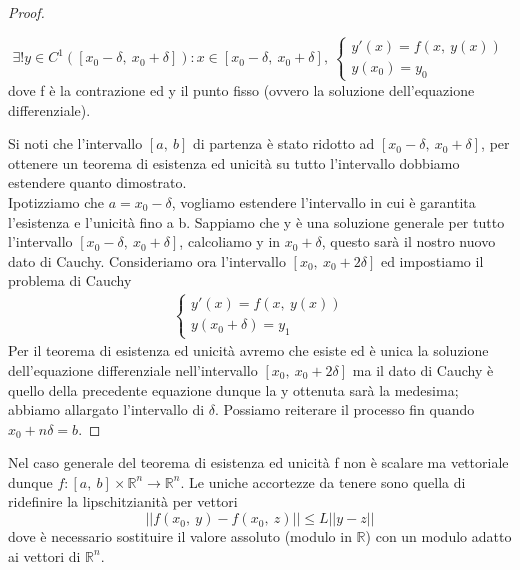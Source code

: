\documentclass[10pt,a4paper]{article}
\newtheorem{proof}{Proof}
\begin{document}
\begin{proof}
\begin{enumerate}
		\[\exists! y \in C^1([x_0-\delta,\ x_0 + \delta]): x\in [x_0-\delta,\ x_0+\delta],\
		 \begin{cases}
			y'(x)=f(x,\ y(x))\\
			y(x_0)=y_0
		\end{cases}\]
		dove f è la contrazione ed y il punto fisso (ovvero la soluzione dell'equazione differenziale). 
	\end{enumerate}
	Si noti che l'intervallo \([a,\ b]\) di partenza è stato ridotto ad \([x_0-\delta,\ x_0+\delta]\), per ottenere un teorema di esistenza ed unicità su tutto l'intervallo dobbiamo estendere quanto dimostrato. \\
	Ipotizziamo che \(a = x_0-\delta\), vogliamo estendere l'intervallo in cui è garantita l'esistenza e l'unicità fino a b. Sappiamo che y è una soluzione generale per tutto l'intervallo \([x_0-\delta,\ x_0+\delta]\), calcoliamo y in \(x_0+\delta\), questo sarà il nostro nuovo dato di Cauchy. Consideriamo ora l'intervallo \([x_0,\ x_0+2\delta]\) ed impostiamo il problema di Cauchy
	\begin{align*}
		 \begin{cases}
			y'(x)= f(x,\ y(x))\\
			y(x_0+\delta)=y_1
		\end{cases}
	\end{align*}
	Per il teorema di esistenza ed unicità avremo che esiste ed è unica la soluzione dell'equazione differenziale nell'intervallo \([x_0,\ x_0+2\delta]\) ma il dato di Cauchy è quello della precedente equazione dunque la y ottenuta sarà la medesima; abbiamo allargato l'intervallo di $\delta$. Possiamo reiterare il processo fin quando \(x_0+n\delta = b\). 
\end{proof}
Nel caso generale del teorema di esistenza ed unicità f non è scalare ma vettoriale dunque \(f: [a,\ b]\times \mathbb{R}^n\to\mathbb{R}^n\). Le uniche accortezze da tenere sono quella di ridefinire la lipschitzianità per vettori
\[||f(x_0,\ y)-f(x_0,\ z)||\leq L||y-z||\]
dove è necessario sostituire il valore assoluto (modulo in $\mathbb{R}$) con un modulo adatto ai vettori di $\mathbb{R}^n$. 
\end{document}
